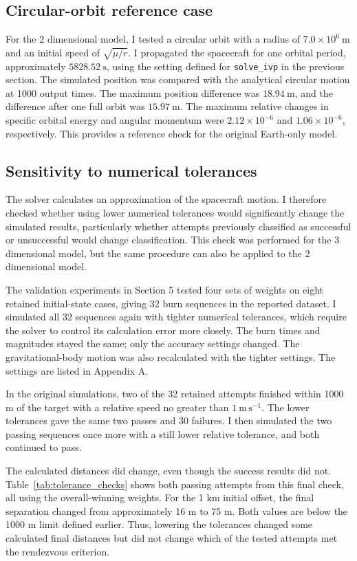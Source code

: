 \documentclass[11pt,letterpaper]{article}
\begin{document}
\subsection{Circular-orbit reference case}
For the 2 dimensional model, I tested a circular orbit with a radius of
$7.0\times10^6\ \mathrm{m}$ and an initial speed of
$\sqrt{\mu/r}$. I propagated the spacecraft for one orbital period,
approximately $5828.52\ \mathrm{s}$, using the setting defined for \texttt{solve\_ivp} in the previous section.
The simulated position was compared with the analytical circular motion
at 1000 output times. The maximum position difference was $18.94\ \mathrm{m}$,
and the difference after one full orbit was $15.97\ \mathrm{m}$.
The maximum relative changes in specific orbital energy and angular
momentum were $2.12\times10^{-6}$ and $1.06\times10^{-6}$, respectively.
This provides a reference check for the original Earth-only model.

\subsection{Sensitivity to numerical tolerances}
The solver calculates an approximation of the spacecraft motion.
I therefore checked whether using lower numerical tolerances would
significantly change the simulated results, particularly whether
attempts previously classified as successful or unsuccessful would
change classification. This check was performed for the 3 dimensional
model, but the same procedure can also be applied to the 2 dimensional
model.

The validation experiments in Section 5 tested four sets of weights
on eight retained initial-state cases, giving 32 burn sequences in the
reported dataset. I simulated all 32 sequences again with tighter numerical tolerances, which require
the solver to control its calculation error more closely. The burn
times and magnitudes stayed the same; only the accuracy settings
changed. The gravitational-body motion was also recalculated with
the tighter settings. The settings are listed in Appendix A.

In the original simulations, two of the 32 retained attempts finished within
1000 m of the target with a relative speed no greater than
$1\ \mathrm{m\,s^{-1}}$. The lower tolerances gave the same
two passes and 30 failures. I then simulated the two passing sequences
once more with a still lower relative tolerance, and both continued to pass.

The calculated distances did change, even though the success results
did not. Table~\ref{tab:tolerance_checks} shows both passing
attempts from this final check, all using the overall-winning weights. For the 1 km initial
offset, the final separation changed from approximately 16 m to 75 m.
Both values are below the 1000 m limit defined earlier. Thus, lowering
the tolerances changed some calculated final distances but did not
change which of the tested attempts met the rendezvous criterion.
\end{document}
